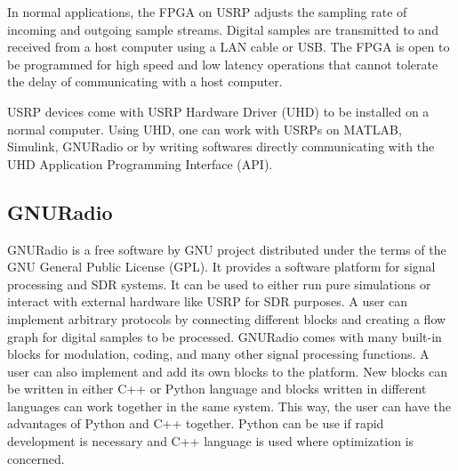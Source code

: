 In normal applications, the FPGA on USRP adjusts the sampling rate of incoming and outgoing sample streams. Digital samples are transmitted to and received from a host computer using a LAN cable or USB. The FPGA is open to be programmed for high speed and low latency operations that cannot tolerate the delay of communicating with a host computer.

USRP devices come with USRP Hardware Driver (UHD) to be installed on a normal computer. Using UHD, one can work with USRPs on MATLAB, Simulink, GNURadio or by writing softwares directly communicating with the UHD Application Programming Interface (API).


\subsection{GNURadio}

GNURadio is a free software by GNU project distributed under the terms of the GNU General Public License (GPL). It provides a software platform for signal processing and SDR systems. It can be used to either run pure simulations or interact with external hardware like USRP for SDR purposes. A user can implement arbitrary protocols by connecting different blocks and creating a flow graph for digital samples to be processed. GNURadio comes with many built-in blocks for modulation, coding, and many other signal processing functions. A user can also implement and add its own blocks to the platform. New blocks can be written in either C++ or Python language and blocks written in different languages can work together in the same system. This way, the user can have the advantages of Python and C++ together. Python can be use if rapid development is necessary and C++ language is used where optimization is concerned.